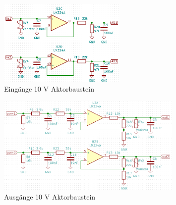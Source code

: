 \begin{figure}[h!]
	\centering
	\includegraphics[width=0.55\textwidth]{graphics/shematics_aktor_input.png}
	\caption{Eingänge 10 V Aktorbaustein}
	\label{pic: Input_aktor}
\end{figure}
\begin{figure}[h!]
	\centering
	\includegraphics[width=0.8\textwidth]{graphics/shematics_aktor_output.png}
	\caption{Ausgänge 10 V Aktorbaustein}
	\label{pic: Output_aktor}
\end{figure}
\newpage

